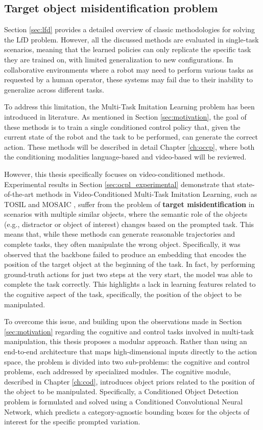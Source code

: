 \subsection{Target object misidentification problem}
\label{sec:sota_conclusion}
Section \ref{sec:lfd} provides a detailed overview of classic methodologies for solving the LfD problem. However, all the discussed methods are evaluated in single-task scenarios, meaning that the learned policies can only replicate the specific task they are trained on, with limited generalization to new configurations. In collaborative environments where a robot may need to perform various tasks as requested by a human operator, these systems may fail due to their inability to generalize across different tasks.

To address this limitation, the Multi-Task Imitation Learning problem has been introduced in literature. As mentioned in Section \ref{sec:motivation}, the goal of these methods is to train a single conditioned control policy that, given the current state of the robot and the task to be performed, can generate the correct action. These methods will be described in detail Chapter \ref{ch:occp}, where both the conditioning modalities language-based and video-based will be reviewed.

However, this thesis specifically focuses on video-conditioned methods. Experimental results in Section \ref{sec:ocpl_experimental} demonstrate that state-of-the-art methods in Video-Conditioned Multi-Task Imitation Learning, such as TOSIL \cite{dasari2021transformers_one_shot} and MOSAIC \cite{mandi2022towards_more_generalizable_one_shot}, suffer from the problem of \textbf{target misidentification} in scenarios with multiple similar objects, where the semantic role of the objects (e.g., distractor or object of interest) changes based on the prompted task. This means that, while these methods can generate reasonable trajectories and complete tasks, they often manipulate the wrong object. Specifically, it was observed that the backbone failed to produce an embedding that encodes the position of the target object at the beginning of the task. In fact, by performing ground-truth actions for just two steps at the very start, the model was able to complete the task correctly. This highlights a lack in learning features related to the cognitive aspect of the task, specifically, the position of the object to be manipulated.

To overcome this issue, and building upon the observations made in Section \ref{sec:motivation} regarding the cognitive and control tasks involved in multi-task manipulation, this thesis proposes a modular approach. Rather than using an end-to-end architecture that maps high-dimensional inputs directly to the action space, the problem is divided into two sub-problems: the cognitive and control problems, each addressed by specialized modules. The cognitive module, described in Chapter \ref{ch:cod}, introduces object priors related to the position of the object to be manipulated. Specifically, a Conditioned Object Detection problem is formulated and solved using a Conditioned Convolutional Neural Network, which predicts a category-agnostic bounding boxes for the objects of interest for the specific prompted variation.


